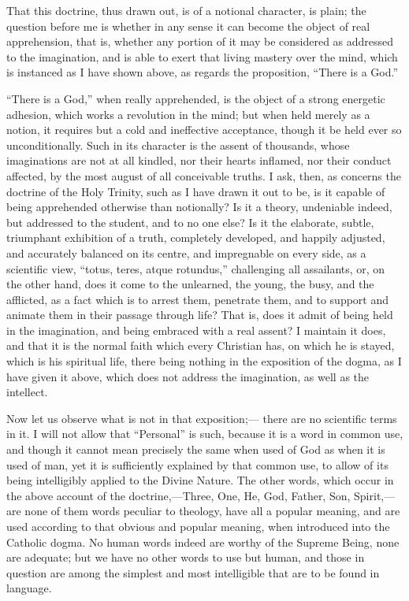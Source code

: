 That this doctrine, thus drawn out, is of a notional character, is
plain; the question before me is whether in any sense it can become
the object of real apprehension, that is, whether any portion of it
may be considered as addressed to the imagination, and is able to
exert that living mastery over the mind, which is instanced as I have
shown above, as regards the proposition, ``There is a God.''

``There is a God,'' when really apprehended, is the object
of a strong energetic adhesion, which works a revolution in the mind;
but when held merely as a notion, it requires but a cold and
ineffective acceptance, though it be held ever so unconditionally.
Such in its character is the assent of thousands, whose imaginations
are not at all kindled, nor their hearts inflamed, nor their conduct
affected, by the most august of all conceivable truths. I ask, then,
as concerns the doctrine of the Holy Trinity, such as I have drawn it
out to be, is it capable of being apprehended otherwise than
notionally? Is it a theory, undeniable indeed, but addressed to the
student, and to no one else? Is it the elaborate, subtle, triumphant
exhibition of a truth, completely developed, and happily adjusted, and
accurately balanced on its centre, and impregnable on every side, as a
scientific view, ``totus, teres, atque rotundus,'' challenging
all assailants, or, on the other hand, does it come to the unlearned,
the young, the busy, and the afflicted, as a fact which is to arrest
them, penetrate them, and to support and animate them in their passage
through life? That is, does it admit of being held in the
imagination, and being embraced with a real assent? I maintain it
does, and that it is the normal faith which every Christian has, on
which he is stayed, which is his spiritual life, there being nothing
in the exposition of the dogma, as I have given it above, which does
not address the imagination, as well as the intellect.

Now let us observe what is not in that exposition;— there are no
scientific terms in it. I will not allow that ``Personal'' is
such, because it is a word in common use, and though it cannot mean
precisely the same when used of God as when it is used of man, yet it
is sufficiently explained by that common use, to allow of its being
intelligibly applied to the Divine Nature. The other words, which
occur in the above account of the doctrine,—Three, One, He, God,
Father, Son, Spirit,—are none of them words peculiar to theology,
have all a popular meaning, and are used according to that obvious and
popular meaning, when introduced into the Catholic dogma. No human
words indeed are worthy of the Supreme Being, none are adequate; but
we have no other words to use but human, and those in question are
among the simplest and most intelligible that are to be found in
language.

